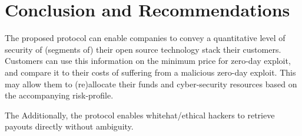 \section{Conclusion and Recommendations}
\label{sec:conclusion}
The proposed protocol can enable companies to convey a quantitative level of security of (segments of) their open source technology stack their customers. Customers can use this information on the minimum price for zero-day exploit, and compare it to their costs of suffering from a malicious zero-day exploit. This may allow them to (re)allocate their funds and cyber-security resources based on the accompanying risk-profile. 

The Additionally, the protocol enables whitehat/ethical hackers to retrieve payouts directly without ambiguity.





